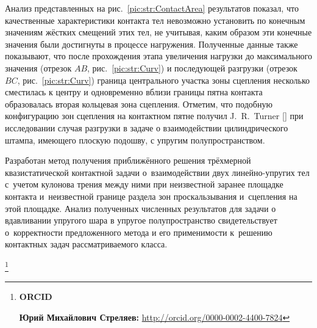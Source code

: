 Анализ представленных на рис.~\ref{pic:str:ContactArea} результатов показал, что качественные характеристики контакта тел невозможно установить по конечным значениям жёстких смещений этих тел, не учитывая, каким образом эти конечные значения были достигнуты в процессе нагружения.
Полученные данные также показывают, что после прохождения этапа увеличения нагрузки до максимального значения (отрезок ${AB}$, рис.~\ref{pic:str:Curv}) и последующей разгрузки (отрезок ${BC}$, рис.~\ref{pic:str:Curv}) граница центрального участка зоны сцепления несколько сместилась к центру и одновременно вблизи границы пятна контакта образовалась вторая кольцевая зона сцепления.
Отметим, что подобную конфигурацию зон сцепления на контактном пятне получил J.~R.~Turner [] при исследовании случая разгрузки в задаче о взаимодействии цилиндрического штампа, имеющего плоскую подошву, с упругим полупространством.

\smallskip

 Разработан метод получения приближённого решения трёхмерной квазистатической контактной задачи о~взаимодействии двух линейно-упругих тел с~учетом кулонова трения между ними при неизвестной заранее площадке контакта и~неизвестной границе раздела зон проскальзывания и~сцепления на этой площадке.
Анализ полученных численных результатов для задачи о вдавливании упругого шара в упругое полупространство свидетельствует о~корректности предложенного метода и его применимости к~решению контактных задач рассматриваемого класса.


\smallskip

\pagebreak

\thanks{{\bf ORCID}

{\bf  Юрий Михайлович Стреляев:} \url{http://orcid.org/0000-0002-4400-7824}

}


\RusRef

